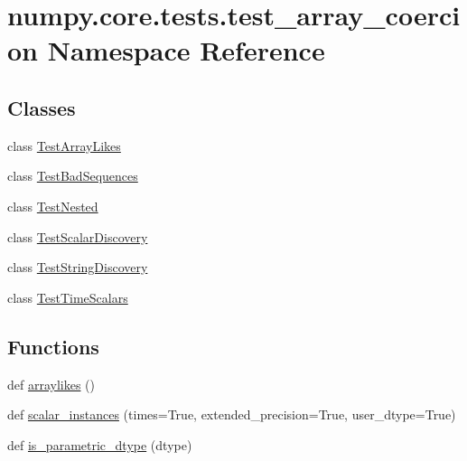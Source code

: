 \hypertarget{namespacenumpy_1_1core_1_1tests_1_1test__array__coercion}{}\section{numpy.\+core.\+tests.\+test\+\_\+array\+\_\+coercion Namespace Reference}
\label{namespacenumpy_1_1core_1_1tests_1_1test__array__coercion}
\subsection*{Classes}
\begin{DoxyCompactItemize}
\item 
class \hyperlink{classnumpy_1_1core_1_1tests_1_1test__array__coercion_1_1TestArrayLikes}{Test\+Array\+Likes}
\item 
class \hyperlink{classnumpy_1_1core_1_1tests_1_1test__array__coercion_1_1TestBadSequences}{Test\+Bad\+Sequences}
\item 
class \hyperlink{classnumpy_1_1core_1_1tests_1_1test__array__coercion_1_1TestNested}{Test\+Nested}
\item 
class \hyperlink{classnumpy_1_1core_1_1tests_1_1test__array__coercion_1_1TestScalarDiscovery}{Test\+Scalar\+Discovery}
\item 
class \hyperlink{classnumpy_1_1core_1_1tests_1_1test__array__coercion_1_1TestStringDiscovery}{Test\+String\+Discovery}
\item 
class \hyperlink{classnumpy_1_1core_1_1tests_1_1test__array__coercion_1_1TestTimeScalars}{Test\+Time\+Scalars}
\end{DoxyCompactItemize}
\subsection*{Functions}
\begin{DoxyCompactItemize}
\item 
def \hyperlink{namespacenumpy_1_1core_1_1tests_1_1test__array__coercion_a9e29bbf3f7a61359fd7f0e6d209c2e40}{arraylikes} ()
\item 
def \hyperlink{namespacenumpy_1_1core_1_1tests_1_1test__array__coercion_a05348eea13c6dd9f83e3781464ecb484}{scalar\+\_\+instances} (times=True, extended\+\_\+precision=True, user\+\_\+dtype=True)
\item 
def \hyperlink{namespacenumpy_1_1core_1_1tests_1_1test__array__coercion_a5558fd4669aff55a30433bbfb240fdea}{is\+\_\+parametric\+\_\+dtype} (dtype)
\end{DoxyCompactItemize}
